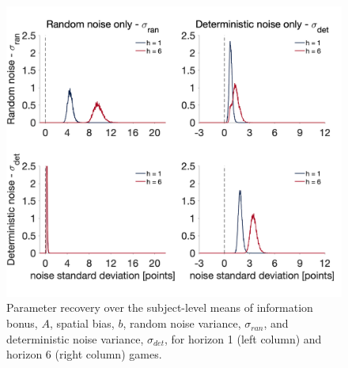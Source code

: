 \documentclass[12pt]{article}
\begin{document}
	\begin{figure}[hp]
		\begin{center}
			\includegraphics[width=1\textwidth]{figures/RanDetNoise_pure_ran_det_simu_hyperprior.png}
			\caption{Parameter recovery over the subject-level means of information bonus, $A$, spatial bias, $b$, random noise variance, $\sigma_{ran}$, and deterministic noise variance, $\sigma_{det}$, for horizon 1 (left column) and horizon 6 (right column) games. 
			}
			\label{fig:pararecover1}
		\end{center}
	\end{figure} 
	
	
	
\end{document}
